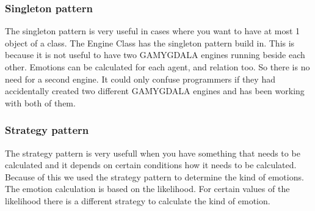 	\subsubsection{Singleton pattern}
The singleton pattern is very useful in cases where you want to have at most 1 object 	of a class. The Engine Class has the singleton pattern build in. This is because it is not useful to have two GAMYGDALA engines running beside each other. Emotions can be calculated for each agent, and relation too. So there is no need for a second engine. It could only confuse programmers if they had accidentally created two different GAMYGDALA engines and has been working with both of them.  
  
	\subsubsection{Strategy pattern}
The strategy pattern is very usefull when you have something that needs to be calculated and it depends on certain conditions how it needs to be calculated. Because of this we used the strategy pattern to determine the kind of emotions. The emotion calculation is based on the likelihood. For certain values of the likelihood there is a different strategy to calculate the kind of emotion.